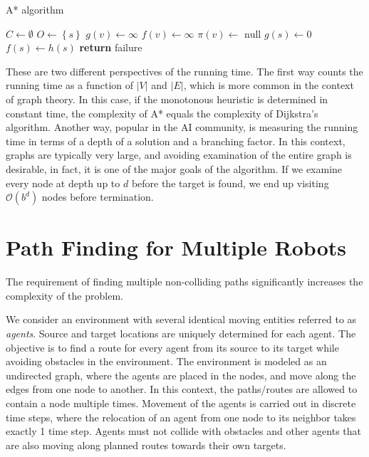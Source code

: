 \begin{algorithm}
\DontPrintSemicolon
\SetAlgoLined
\caption{A* algorithm}
\BlankLine
{}
\BlankLine
	$C\leftarrow\emptyset$ 
	$O\leftarrow\left\{s\right\}$  
 {
	$g(v)\leftarrow\infty$\;
	$f(v)\leftarrow\infty$\;
	$\pi(v)\leftarrow \text{ null}$ 
}
$g(s)\leftarrow 0$\;
$f(s)\leftarrow h(s)$\;
\textbf{return } failure
\label{alg:astar}
\end{algorithm}

These are two different perspectives of the running time. 
The first way counts the running time as a function of $|V|$ and $|E|$, which is more common in the context of graph theory.
In this case, if the monotonous heuristic is determined in constant time, the complexity of A* equals the complexity of Dijkstra's algorithm. 
Another way, popular in the AI community, is measuring the running time in terms of a depth of a solution and a branching factor.
In this context, graphs are typically very large, and avoiding examination of the entire graph is desirable, in fact, it is one of the major goals of the algorithm.
If we examine every node at depth up to $d$ before the target is found, we end up visiting $\mathcal{O}(b^d)$ nodes before termination.

\section{Path Finding for Multiple Robots}

The requirement of finding multiple non-colliding paths significantly increases the complexity of the problem.

We consider an environment with several identical moving entities referred to as \emph{agents}. 
Source and target locations are uniquely determined for each agent. 
The objective is to find a route for every agent from its source to its target while avoiding obstacles in the environment.
The environment is modeled as an undirected graph, where the agents are placed in the nodes, and move along the edges from one node to another. 
In this context, the paths/routes are allowed to contain a node multiple times.
Movement of the agents is carried out in discrete time steps, where the relocation of an agent from one node to its neighbor takes exactly 1 time step.
Agents must not collide with obstacles and other agents that are also moving along planned routes towards their own targets.

